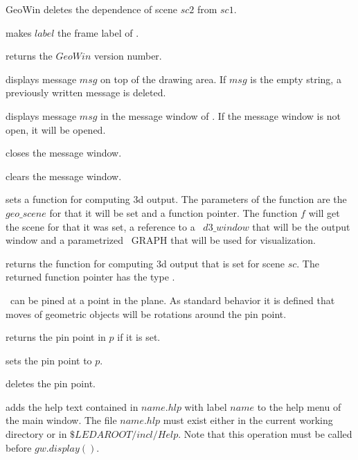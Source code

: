 \begin{ccRefClass}{GeoWin}
{deletes the dependence of scene $sc2$ from $sc1$. }

{makes $label$ the frame label of \ccVar. }
	
{returns the $GeoWin$ version number.}
  	   
{displays message $msg$ on top of the drawing area.
If $msg$ is the empty string, a previously written message is deleted.}

{displays message $msg$ in the message window of \ccVar.
If the message window is not open, it will be opened.}
  
{closes the message window.}
 
{clears the message window.}

\begin{ccAdvanced}

{sets a function for computing 3d output. The parameters of the function are
the $geo\_scene$ for that it will be set and a function pointer. The function $f$ will get the scene
for that it was set, a reference to a \leda\ $d3\_window$ that will be the output window and a 
parametrized \leda\ GRAPH that will be used for visualization.}

{returns the function for computing 3d output that is set for scene $sc$.
The returned function pointer has the type .}

\end{ccAdvanced}

\medskip
\ccVar\ can be pined at a point in the plane. As standard behavior it is
defined that moves of geometric objects will be rotations around the
pin point. 

{returns the pin point in $p$ if it is set.}

{sets the pin point to $p$.}

{deletes the pin point.}

{adds the help text contained in $name.hlp$ with label $name$
to the help menu of the main window. The file $name.hlp$ must
exist either in the current working directory or in
$\$LEDAROOT/incl/Help$. Note that this operation must be called
before $gw.display()$. }


\end{ccRefClass}

